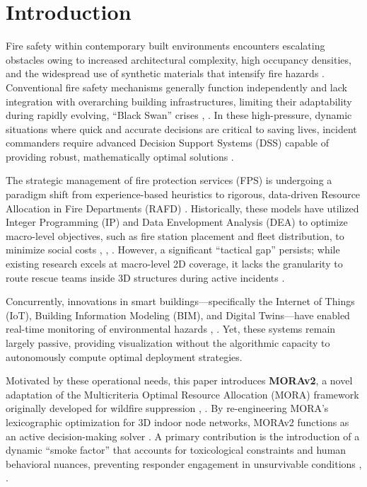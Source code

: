 \section{Introduction}
\label{sec:introduction}

Fire safety within contemporary built environments encounters escalating obstacles owing to increased architectural complexity, 
high occupancy densities, and the widespread use of synthetic materials that intensify fire hazards \cite{Muller2025}. 
Conventional fire safety mechanisms generally function independently and lack integration with overarching building infrastructures, 
limiting their adaptability during rapidly evolving, ``Black Swan'' crises \cite{Kinkel2025}, \cite{Singh2023}. 
In these high-pressure, dynamic situations where quick and accurate decisions are critical to saving lives, 
incident commanders require advanced Decision Support Systems (DSS) capable of providing robust, mathematically optimal solutions 
\cite{GrandaChico2025}.

The strategic management of fire protection services (FPS) is undergoing a paradigm shift from experience-based heuristics to rigorous, 
data-driven Resource Allocation in Fire Departments (RAFD) \cite{Eslamzadeh2022}. 
Historically, these models have utilized Integer Programming (IP) and Data Envelopment Analysis (DEA) to optimize macro-level objectives, 
such as fire station placement and fleet distribution, to minimize social costs \cite{Eslamzadeh2022}, \cite{Taylor2023}, \cite{Patel2025}. 
However, a significant ``tactical gap'' persists; while existing research excels at macro-level 2D coverage, 
it lacks the granularity to route rescue teams inside 3D structures during active incidents \cite{Eslamzadeh2022}.

Concurrently, innovations in smart buildings—specifically the Internet of Things (IoT), Building Information Modeling (BIM), 
and Digital Twins—have enabled real-time monitoring of environmental hazards \cite{Smith2025}, \cite{Abdullahi2025}. 
Yet, these systems remain largely passive, providing visualization without the algorithmic capacity to 
autonomously compute optimal deployment strategies. 

Motivated by these operational needs, this paper introduces \textbf{MORAv2}, 
a novel adaptation of the Multicriteria Optimal Resource Allocation (MORA) framework originally developed for wildfire suppression
\cite{Orphanoudakis2025}, \cite{Ontario_Fire_Group_2024}. 
By re-engineering MORA's lexicographic optimization for 3D indoor node networks, 
MORAv2 functions as an active decision-making solver \cite{GrandaChico2025}. 
A primary contribution is the introduction of a dynamic ``smoke factor'' that accounts for toxicological constraints 
and human behavioral nuances, preventing responder engagement in unsurvivable conditions \cite{Kinkel2025}, \cite{Fisher2024}.